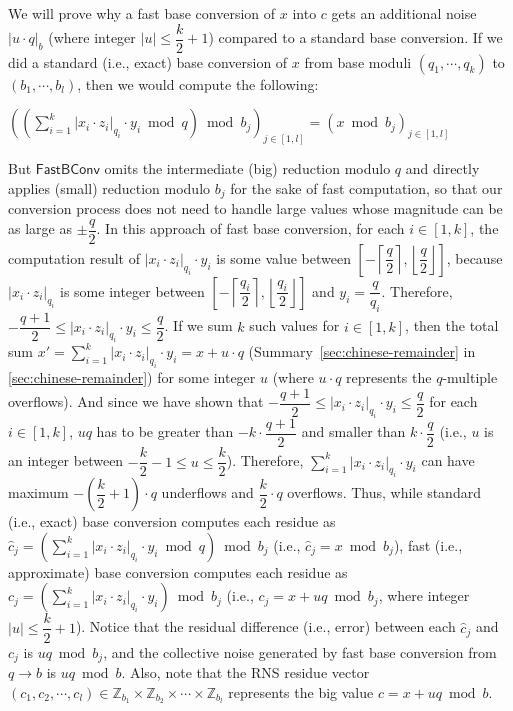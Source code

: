\begin{myproof}

We will prove why a fast base conversion of $x$ into $c$ gets an additional noise $|u\cdot q|_b$ (where integer $|u| \leq \dfrac{k}{2}+1$) compared to a standard base conversion. If we did a standard (i.e., exact) base conversion of $x$ from base moduli $(q_1, \cdots, q_k)$ to $(b_1, \cdots, b_l)$, then we would compute the following:

$\left( \left( \sum\limits_{i=1}^{k} |x_i \cdot z_i|_{q_i} \cdot y_i \bmod q \right) \bmod b_j \right)_{j \in [1,l]} = \left( x \bmod b_j \right)_{j \in [1,l]}$

But $\textsf{FastBConv}$ omits the intermediate (big) reduction modulo $q$ and directly applies (small) reduction modulo $b_j$ for the sake of fast computation, so that our conversion process does not need to handle large values whose magnitude can be as large as $\pm\dfrac{q}{2}$. In this approach of fast base conversion, for each $i \in [1, k]$, the computation result of $|x_i \cdot z_i|_{q_i} \cdot y_i$ is some value between $\left[-\left\lceil\dfrac{q}{2}\right\rceil, \left\lfloor\dfrac{q}{2}\right\rfloor\right]$, because $|x_i \cdot z_i|_{q_i}$ is some integer between $\left[-\left\lceil\dfrac{q_i}{2}\right\rceil, \left\lfloor\dfrac{q_i}{2}\right\rfloor\right]$ and $y_i = \dfrac{q}{q_i}$. Therefore, $-\dfrac{q+1}{2} \leq |x_i \cdot z_i|_{q_i} \cdot y_i \leq \dfrac{q}{2}$. If we sum $k$ such values for $i \in [1, k]$, then the total sum $x' = \sum\limits_{i=1}^{k} |x_i \cdot z_i|_{q_i} \cdot y_i = x + u\cdot q$ (Summary~\ref*{sec:chinese-remainder} in \autoref{sec:chinese-remainder}) for some integer $u$ (where $u\cdot q$ represents the $q$-multiple overflows). And since we have shown that $-\dfrac{q+1}{2} \leq |x_i \cdot z_i|_{q_i} \cdot y_i \leq \dfrac{q}{2}$ for each $i \in [1, k]$, $uq$ has to be greater than $-k\cdot\dfrac{q+1}{2}$ and smaller than $k\cdot\dfrac{q}{2}$ (i.e., $u$ is an integer between $-\dfrac{k}{2} - 1 \leq u \leq \dfrac{k}{2}$). Therefore, $\sum\limits_{i=1}^{k} |x_i \cdot z_i|_{q_i} \cdot y_i$ can have maximum $-\left(\dfrac{k}{2} + 1\right)\cdot q$ underflows and $\dfrac{k}{2}\cdot q$ overflows. Thus, while standard (i.e., exact) base conversion computes each residue as $\hat{c}_j = \left(\sum\limits_{i=1}^{k} |x_i \cdot z_i|_{q_i} \cdot y_i \bmod q\right) \bmod b_j$ (i.e., $\hat{c}_j = x \bmod b_j$), fast (i.e., approximate) base conversion computes each residue as $c_j = \left(\sum\limits_{i=1}^{k} |x_i \cdot z_i|_{q_i} \cdot y_i\right) \bmod b_j$ (i.e., $c_j = x + uq \bmod b_j$, where integer $|u| \leq \dfrac{k}{2} + 1$). Notice that the residual difference (i.e., error) between each $\hat{c}_j$ and $c_j$ is $uq \bmod b_j$, and the collective noise generated by fast base conversion from $q \rightarrow  b$ is  $uq \bmod b$. Also, note that the RNS residue vector $(c_1, c_2, \cdots, c_l) \in \mathbb{Z}_{b_1} \times \mathbb{Z}_{b_2} \times \cdots \times \mathbb{Z}_{b_l}$ represents the big value $c = x + uq \bmod b$. 


\end{myproof}

